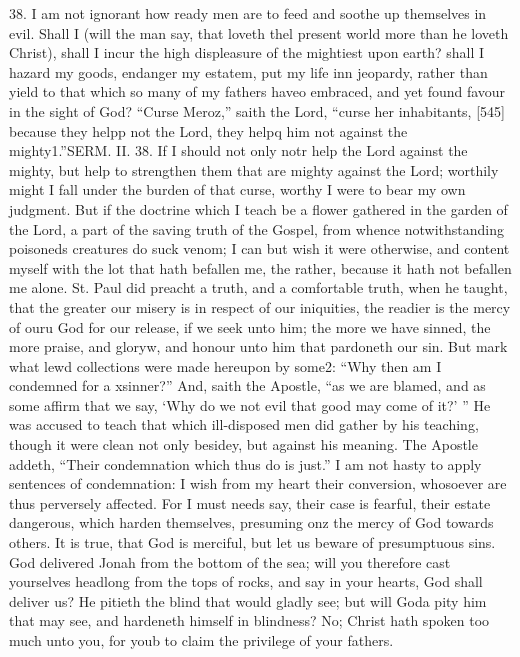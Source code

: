 38. I am not ignorant how ready men are to feed and soothe up themselves in evil. Shall I (will the man say, that loveth thel present world more than he loveth Christ), shall I incur the high displeasure of the mightiest upon earth? shall I hazard my goods, endanger my estatem, put my life inn jeopardy, rather than yield to that which so many of my fathers haveo embraced, and yet found favour in the sight of God? “Curse Meroz,” saith the Lord, “curse her inhabitants, [545] because they helpp not the Lord, they helpq him not against the mighty1.”SERM. II. 38. If I should not only notr help the Lord against the mighty, but help to strengthen them that are mighty against the Lord; worthily might I fall under the burden of that curse, worthy I were to bear my own judgment. But if the doctrine which I teach be a flower gathered in the garden of the Lord, a part of the saving truth of the Gospel, from whence notwithstanding poisoneds creatures do suck venom; I can but wish it were otherwise, and content myself with the lot that hath befallen me, the rather, because it hath not befallen me alone. St. Paul did preacht a truth, and a comfortable truth, when he taught, that the greater our misery is in respect of our iniquities, the readier is the mercy of ouru God for our release, if we seek unto him; the more we have sinned, the more praise, and gloryw, and honour unto him that pardoneth our sin. But mark what lewd collections were made hereupon by some2: “Why then am I condemned for a xsinner?” And, saith the Apostle, “as we are blamed, and as some affirm that we say, ‘Why do we not evil that good may come of it?’ ” He was accused to teach that which ill-disposed men did gather by his teaching, though it were clean not only besidey, but against his meaning. The Apostle addeth, “Their condemnation which thus do is just.” I am not hasty to apply sentences of condemnation: I wish from my heart their conversion, whosoever are thus perversely affected. For I must needs say, their case is fearful, their estate dangerous, which harden themselves, presuming onz the mercy of God towards others. It is true, that God is merciful, but let us beware of presumptuous sins. God delivered Jonah from the bottom of the sea; will you therefore cast yourselves headlong from the tops of rocks, and say in your hearts, God shall deliver us? He pitieth the blind that would gladly see; but will Goda pity him that may see, and hardeneth himself in blindness? No; Christ hath spoken too much unto you, for youb to claim the privilege of your fathers.

